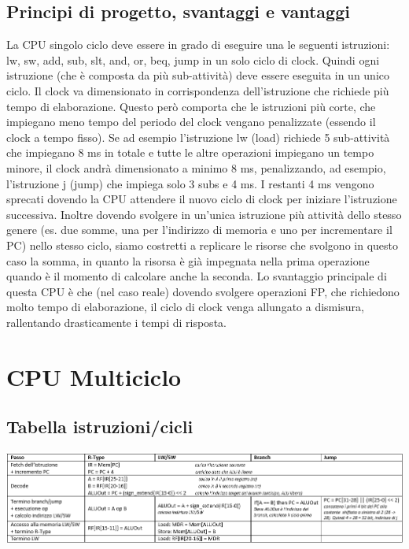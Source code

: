 \documentclass[italian]{article}
\begin{document}
	\subsection{Principi di progetto, svantaggi e vantaggi}
	La CPU singolo ciclo deve essere in grado di eseguire una le seguenti istruzioni: lw, sw, add, sub, slt, and, or, beq, jump in un solo ciclo di clock. Quindi ogni istruzione (che è composta da più sub-attività) deve essere eseguita in un unico ciclo. Il clock va dimensionato in corrispondenza dell’istruzione che richiede più tempo di elaborazione. Questo però comporta che le istruzioni più corte, che impiegano meno tempo del periodo del clock vengano penalizzate (essendo il clock a tempo fisso).  Se ad esempio l’istruzione lw (load) richiede 5 sub-attività che impiegano 8 ms in totale e tutte le altre operazioni impiegano un tempo minore, il clock andrà dimensionato a minimo 8 ms, penalizzando, ad esempio, l’istruzione j (jump) che impiega solo 3 subs e 4 ms. I restanti 4 ms vengono sprecati dovendo la CPU attendere il nuovo ciclo di clock per iniziare l’istruzione successiva. Inoltre dovendo svolgere in un’unica istruzione più attività dello stesso genere (es. due somme, una per l’indirizzo di memoria e uno per incrementare il PC) nello stesso ciclo, siamo costretti a replicare le risorse che svolgono in questo caso la somma, in quanto la risorsa è già impegnata nella prima operazione quando è il momento di calcolare anche la seconda. Lo svantaggio principale di questa CPU è che (nel caso reale) dovendo svolgere operazioni FP, che richiedono molto tempo di elaborazione, il ciclo di clock venga allungato a dismisura, rallentando drasticamente i tempi di risposta.
	
	\section{CPU Multiciclo}
	
	\subsection{Tabella istruzioni/cicli}
	\begin{center}
		\includegraphics[width=1\linewidth]{slides/cpu.png}
	\end{center}	
	
\end{document}
